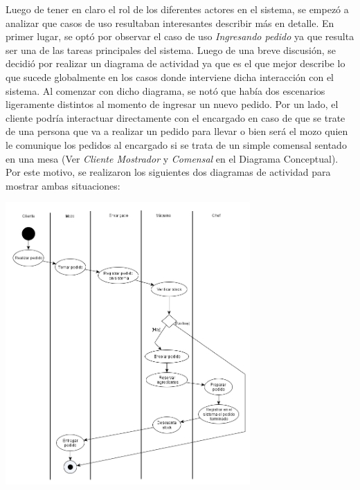 \documentclass[a4paper,11pt] {article}
\begin{document}
Luego de tener en claro el rol de los diferentes actores en el sistema, se empez\'o a analizar que casos de uso resultaban interesantes describir m\'as en detalle. En primer lugar, se opt\'o por observar el caso de uso \textit{Ingresando pedido} ya que resulta ser una de las tareas principales del sistema. Luego de una breve discusi\'on, se decidi\'o por realizar un diagrama de actividad ya que es el que mejor describe lo que sucede globalmente en los casos donde interviene dicha interacci\'on con el sistema. Al comenzar con dicho diagrama, se not\'o que hab\'ia dos escenarios ligeramente distintos al momento de ingresar un nuevo pedido. Por un lado, el cliente podr\'ia interactuar directamente con el encargado en caso de que se trate de una persona que va a realizar un pedido para llevar o bien ser\'a el mozo quien le comunique los pedidos al encargado si se trata de un simple comensal sentado en una mesa (Ver \textit{Cliente Mostrador} y \textit{Comensal} en el Diagrama Conceptual). Por este motivo, se realizaron los siguientes dos diagramas de actividad para mostrar ambas situaciones:

\begin{center}
 \includegraphics[width=0.7\textwidth]{Diagramas/DiagramaActividadPedidoLocalMesa.png}
\end{center}
\end{document}

